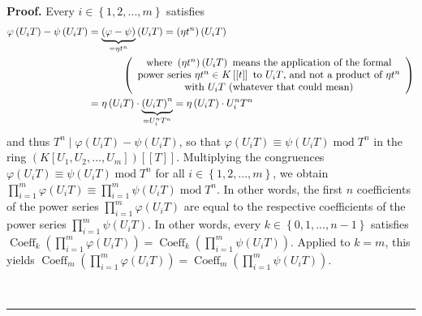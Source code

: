 \documentclass[numbers=enddot,12pt,final,onecolumn,notitlepage]{scrartcl}%
\newenvironment{proof}[1][Proof]{\noindent\textbf{#1.} }{\ \rule{0.5em}{0.5em}}
\begin{document}
\begin{proof}
Every $i\in\left\{  1,2,...,m\right\}  $ satisfies%
\begin{align*}
\varphi\left(  U_{i}T\right)  -\psi\left(  U_{i}T\right)   &
=\underbrace{\left(  \varphi-\psi\right)  }_{=\eta t^{n}}\left(
U_{i}T\right)  =\left(  \eta t^{n}\right)  \left(  U_{i}T\right) \\
&  \ \ \ \ \ \ \ \ \ \ \left(
\begin{array}
[c]{c}%
\text{where }\left(  \eta t^{n}\right)  \left(  U_{i}T\right)  \text{ means
the application of the formal}\\
\text{power series }\eta t^{n}\in K\left[  \left[  t\right]  \right]  \text{
to }U_{i}T\text{, and not a product of }\eta t^{n}\\
\text{with }U_{i}T\text{ (whatever that could mean)}%
\end{array}
\right) \\
&  =\eta\left(  U_{i}T\right)  \cdot\underbrace{\left(  U_{i}T\right)  ^{n}%
}_{=U_{i}^{n}T^{n}}=\eta\left(  U_{i}T\right)  \cdot U_{i}^{n}T^{n}%
\end{align*}
and thus $T^{n}\mid\varphi\left(  U_{i}T\right)  -\psi\left(  U_{i}T\right)
$, so that $\varphi\left(  U_{i}T\right)  \equiv\psi\left(  U_{i}T\right)
\operatorname{mod}T^{n}$ in the ring $\left(  K\left[  U_{1},U_{2}%
,...,U_{m}\right]  \right)  \left[  \left[  T\right]  \right]  $. Multiplying
the congruences $\varphi\left(  U_{i}T\right)  \equiv\psi\left(
U_{i}T\right)  \operatorname{mod}T^{n}$ for all $i\in\left\{
1,2,...,m\right\}  $, we obtain $\prod\limits_{i=1}^{m}\varphi\left(
U_{i}T\right)  \equiv\prod\limits_{i=1}^{m}\psi\left(  U_{i}T\right)
\operatorname{mod}T^{n}$. In other words, the first $n$ coefficients of the
power series $\prod\limits_{i=1}^{m}\varphi\left(  U_{i}T\right)  $ are equal
to the respective coefficients of the power series $\prod\limits_{i=1}^{m}%
\psi\left(  U_{i}T\right)  $. In other words, every $k\in\left\{
0,1,...,n-1\right\}  $ satisfies $\operatorname*{Coeff}\nolimits_{k}\left(
\prod\limits_{i=1}^{m}\varphi\left(  U_{i}T\right)  \right)
=\operatorname*{Coeff}\nolimits_{k}\left(  \prod\limits_{i=1}^{m}\psi\left(
U_{i}T\right)  \right)  $. Applied to $k=m$, this yields
$\operatorname*{Coeff}\nolimits_{m}\left(  \prod\limits_{i=1}^{m}%
\varphi\left(  U_{i}T\right)  \right)  =\operatorname*{Coeff}\nolimits_{m}%
\left(  \prod\limits_{i=1}^{m}\psi\left(  U_{i}T\right)  \right)  $.


\end{proof}
\end{document}
